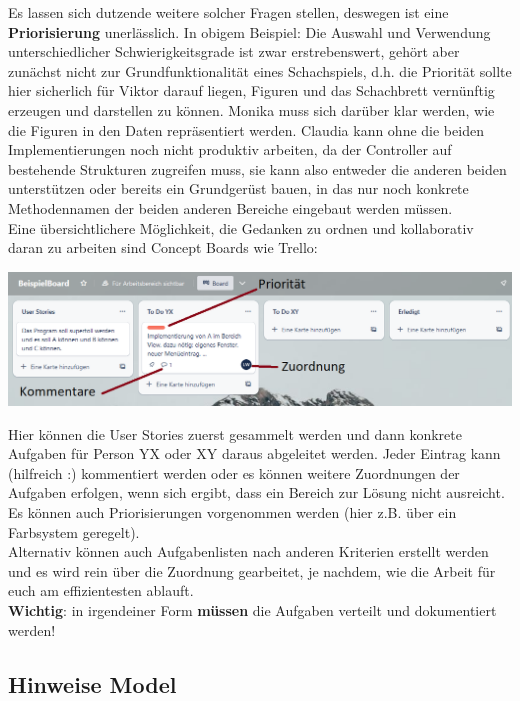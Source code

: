 \documentclass{article}
\begin{document}
Es lassen sich dutzende weitere solcher Fragen stellen, deswegen ist eine \textbf{Priorisierung} unerlässlich. In obigem Beispiel: Die Auswahl und Verwendung unterschiedlicher Schwierigkeitsgrade ist zwar erstrebenswert, gehört aber zunächst nicht zur Grundfunktionalität eines Schachspiels, d.h. die Priorität sollte hier sicherlich für Viktor darauf liegen, Figuren und das Schachbrett vernünftig erzeugen und darstellen zu können. Monika muss sich darüber klar werden, wie die Figuren in den Daten repräsentiert werden. Claudia kann ohne die beiden Implementierungen noch nicht produktiv arbeiten, da der Controller auf bestehende Strukturen zugreifen muss, sie kann also entweder die anderen beiden unterstützen oder bereits ein Grundgerüst bauen, in das nur noch konkrete Methodennamen der beiden anderen Bereiche eingebaut werden müssen. \\
Eine übersichtlichere Möglichkeit, die Gedanken zu ordnen und kollaborativ daran zu arbeiten sind Concept Boards wie Trello:
\begin{center}
    \includegraphics[scale=0.5]{../media/trello.png}
\end{center}
Hier können die User Stories zuerst gesammelt werden und dann konkrete Aufgaben für Person YX oder XY daraus abgeleitet werden. Jeder Eintrag kann (hilfreich :) kommentiert werden oder es können weitere Zuordnungen der Aufgaben erfolgen, wenn sich ergibt, dass ein Bereich zur Lösung nicht ausreicht. Es können auch Priorisierungen vorgenommen werden (hier z.B. über ein Farbsystem geregelt). \\
Alternativ können auch Aufgabenlisten nach anderen Kriterien erstellt werden und es wird rein über die Zuordnung gearbeitet, je nachdem, wie die Arbeit für euch am effizientesten ablauft. \\
\textbf{Wichtig}: in irgendeiner Form \textbf{müssen} die Aufgaben verteilt und dokumentiert werden!

\subsection{Hinweise Model}
\label{sec:hwModel}
\end{document}
